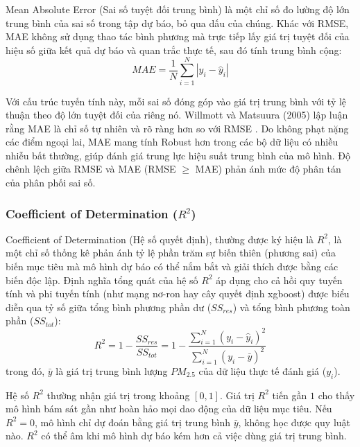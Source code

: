 Mean Absolute Error (Sai số tuyệt đối trung bình) là một chỉ số đo lường độ lớn trung bình của sai số trong tập dự báo, bỏ qua dấu của chúng. Khác với RMSE, MAE không sử dụng thao tác bình phương mà trực tiếp lấy giá trị tuyệt đối của hiệu số giữa kết quả dự báo và quan trắc thực tế, sau đó tính trung bình cộng:
\begin{equation}
    MAE = \frac{1}{N} \sum_{i=1}^{N} \left| y_i - \hat{y}_i \right|
\end{equation}

Với cấu trúc tuyến tính này, mỗi sai số đóng góp vào giá trị trung bình với tỷ lệ thuận theo độ lớn tuyệt đối của riêng nó. Willmott và Matsuura (2005) lập luận rằng MAE là chỉ số tự nhiên và rõ ràng hơn so với RMSE \cite{willmott2005mae}. Do không phạt nặng các điểm ngoại lai, MAE mang tính Robust hơn trong các bộ dữ liệu có nhiều nhiễu bất thường, giúp đánh giá trung lực hiệu suất trung bình của mô hình. Độ chênh lệch giữa RMSE và MAE (RMSE $\geq$ MAE) phản ánh mức độ phân tán của phân phối sai số.

\subsubsection{Coefficient of Determination ($R^2$)}

Coefficient of Determination (Hệ số quyết định), thường được ký hiệu là $R^2$, là một chỉ số thống kê phản ánh tỷ lệ phần trăm sự biến thiên (phương sai) của biến mục tiêu mà mô hình dự báo có thể nắm bắt và giải thích được bằng các biến độc lập. Định nghĩa tổng quát của hệ số $R^2$ áp dụng cho cả hồi quy tuyến tính và phi tuyến tính (như mạng nơ-ron hay cây quyết định xgboost) \cite{nagelkerke1991r2, tirink2025aqi} được biểu diễn qua tỷ số giữa tổng bình phương phần dư ($SS_{res}$) và tổng bình phương toàn phần ($SS_{tot}$):
\begin{equation}
    R^2 = 1 - \frac{SS_{res}}{SS_{tot}} = 1 - \frac{\sum_{i=1}^{N} (y_i - \hat{y}_i)^2}{\sum_{i=1}^{N} (y_i - \bar{y})^2}
\end{equation}
trong đó, $\bar{y}$ là giá trị trung bình lượng $PM_{2.5}$ của dữ liệu thực tế đánh giá ($y_i$). 

Hệ số $R^2$ thường nhận giá trị trong khoảng $[0, 1]$. Giá trị $R^2$ tiến gần $1$ cho thấy mô hình bám sát gần như hoàn hảo mọi dao động của dữ liệu mục tiêu. Nếu $R^2 = 0$, mô hình chỉ dự đoán bằng giá trị trung bình $\bar{y}$, không học được quy luật nào. $R^2$ có thể âm khi mô hình dự báo kém hơn cả việc dùng giá trị trung bình.

